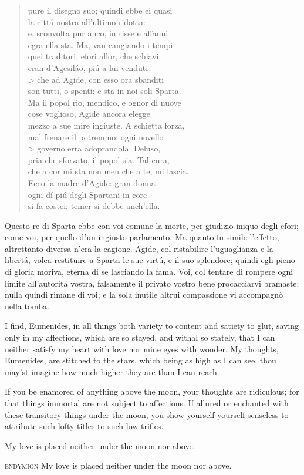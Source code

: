 \documentclass[a5paper,11pt]{book}
\def\testodicontrollo{%
Questo re di Sparta ebbe con voi comune la morte, per giudizio
iniquo degli efori; come voi, per quello d'un ingiusto parlamento.
Ma quanto fu simile l'effetto, altrettanto diversa n'era la
cagione. Agide, col ristabilire l'uguaglianza e la libertá, volea
restituire a Sparta le sue virtú, e il suo splendore; quindi egli
pieno di gloria moriva, eterna di se lasciando la fama. Voi, col
tentare di rompere ogni limite all'autoritá vostra, falsamente il
privato vostro bene procacciarvi bramaste: nulla quindi rimane di
voi; e la sola inutile altrui compassione vi accompagnò nella
tomba.
}
\begin{document}
\begin{verse}
  pure il disegno suo; quindi ebbe ei quasi\\
  la cittá nostra all'ultimo ridotta:\\
  e, sconvolta pur anco, in risse e affanni\\
  egra ella sta. Ma, van cangiando i tempi:\\
  quei traditori, efori allor, che schiavi\\
  eran d'Agesiláo, piú a lui venduti\\>
  che ad Agide, con esso ora sbanditi\\
  son tutti, o spenti: e sta in noi soli Sparta.\\
  Ma il popol rio, mendico, e ognor di nuove\\
  cose voglioso, Agide ancora elegge\\
  mezzo a sue mire ingiuste. A schietta forza,\\
  mal frenare il potremmo; ogni novello\\>
  governo erra adoprandola. Deluso,\\
  pria che sforzato, il popol sia. Tal cura,\\
  che a cor mi sta non men che a te, mi lascia.\\
  Ecco la madre d'Agide: gran donna\\
  ogni dí piú degli Spartani in core\\
  si fa costei: temer si debbe anch'ella.\\
\end{verse}

\testodicontrollo

\begin{drama}
 I find, Eumenides, in all things both variety to
content and satiety to glut, saving only in my affections,
which are so stayed, and withal so stately, that I can
neither satisfy my heart with love nor mine eyes with
wonder. My thoughts, Eumenides, are stitched to the
stars, which being as high as I can see, thou may'st
imagine how much higher they are than I can reach.

 If you be enamored of anything above the
moon, your thoughts are ridiculous; for that things immortal
are not subject to affections. If allured or enchanted with
these transitory things under the moon, you show yourself
yourself senseless to attribute such lofty titles to such low
trifles.

 My love is placed neither under the moon nor
above.

\item[\scshape endymion] My love is placed neither under the moon nor
above.
\end{drama}
\end{document}
